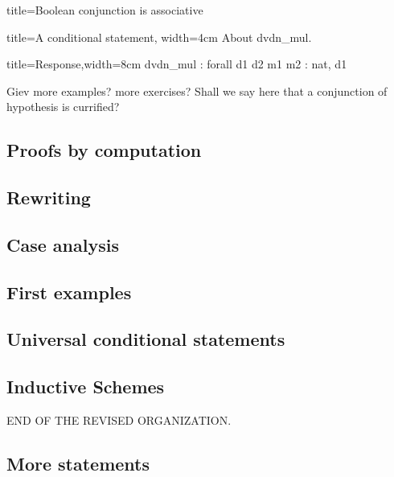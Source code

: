 \begin{coq}{title=Boolean conjunction is associative}
\begin{coq}{title=A conditional statement, width=4cm}
About dvdn_mul.
\end{coq}
\begin{coqout}{title=Response,width=8cm}
dvdn_mul : forall d1 d2 m1 m2 : nat,
  d1 %
\end{coqout}

Giev more examples? more exercises? Shall we say here that a
conjunction of hypothesis is currified?


\subsection{Proofs by computation}

\subsection{Rewriting}

\subsection{Case analysis}


\subsection{First examples}

\subsection{Universal conditional statements}

\subsection{Inductive Schemes}


END OF THE REVISED ORGANIZATION.

\label{ssec:firstex}


\subsection{More statements}

\end{coq}
